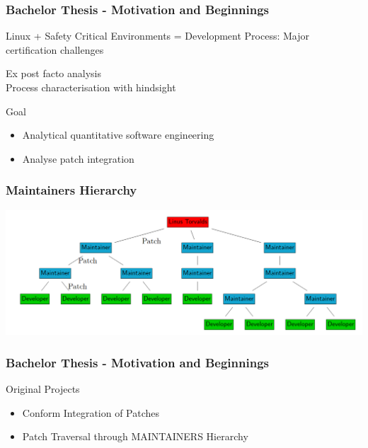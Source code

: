 \documentclass{beamer}
\begin{document}
	\begin{frame}
	\frametitle{Bachelor Thesis - Motivation and Beginnings}
		\begin{block}{Linux + Safety Critical Environments}
			= Development Process: Major certification challenges
		\end{block}
		\Rightarrow Ex post facto analysis\\ %
		\Rightarrow Process characterisation with hindsight

		\begin{alertblock}{Goal}
			\begin{itemize}
				\item Analytical quantitative software engineering
				\item Analyse patch integration
			\end{itemize}
		\end{alertblock}
	\end{frame}


	\begin{frame}
	\frametitle{Maintainers Hierarchy}
     		\includegraphics[width=1.0\textwidth]{pics/maintainers_hierarchy.png}
	\end{frame}


	\begin{frame}
	\frametitle{Bachelor Thesis - Motivation and Beginnings}
		\begin{block}{Original Projects}
			\begin{itemize}
				\item Conform Integration of Patches
				\item Patch Traversal through MAINTAINERS Hierarchy
			\end{itemize}
		\end{block}
	\end{frame}
\end{document}
